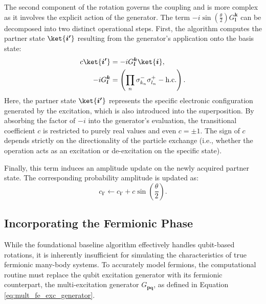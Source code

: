 The second component of the rotation governs the coupling and is more complex as it involves the explicit action of the generator. The term $-i\sin\left(\frac{\theta}{2}\right)G^{\boldsymbol{k}}_{\boldsymbol{l}}$ can be decomposed into two distinct operational steps. First, the algorithm computes the partner state $\ket{\boldsymbol{i'}}$ resulting from the generator's application onto the basis state:
\begin{align}
	c \ket{\boldsymbol{i'}} &= -iG^{\boldsymbol{k}}_{\boldsymbol{l}} \ket{\boldsymbol{i}}, \label{eq:qubit-excitation-baseline-partner-state-1} \\
	-iG^{\boldsymbol{k}}_{\boldsymbol{l}} &= \left( \prod_n \sigma^-_{k_n} \sigma^+_{l_n} - \text{h.c.} \right). \label{eq:qubit-excitation-baseline-partner-state-2}
\end{align}
Here, the partner state $\ket{\boldsymbol{i'}}$ represents the specific electronic configuration generated by the excitation, which is also introduced into the superposition. By absorbing the factor of $-i$ into the generator's evaluation, the transitional coefficient $c$ is restricted to purely real values and even $c = \pm 1$. The sign of $c$ depends strictly on the directionality of the particle exchange (i.e., whether the operation acts as an excitation or de-excitation on the specific state).

Finally, this term induces an amplitude update on the newly acquired partner state. The corresponding probability amplitude is updated as:
\begin{equation}
	c_{\boldsymbol{i'}} \leftarrow c_{\boldsymbol{i'}} + c \sin\left(\frac{\theta}{2}\right). \label{eq:qubit-excitation-partner-state-update-phase}
\end{equation}
\cite[chapter II.A]{kottmann2020feasible}

\subsection{Incorporating the Fermionic Phase}\label{subsec:incorporating-the-fermionic-phase}

While the foundational baseline algorithm effectively handles qubit-based rotations, it is inherently insufficient for simulating the characteristics of true fermionic many-body systems. To accurately model fermions, the computational routine must replace the qubit excitation generator with its fermionic counterpart, the multi-excitation generator $G_{\boldsymbol{pq}}$, as defined in Equation \eqref{eq:mult_fe_exc_generator}.

